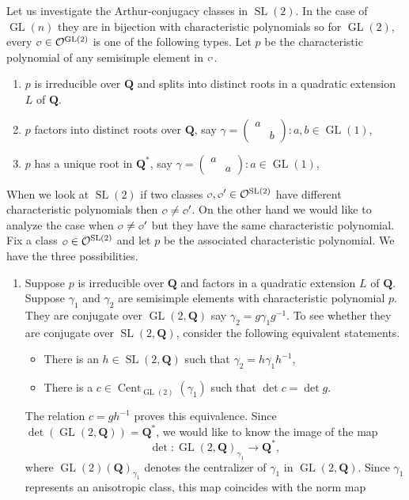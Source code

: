 \documentclass[11pt]{amsart}
\def\Q{\mathbf Q}
\def\O{\mathcal O}
\def\o{\scalebox{0.8}{$\scriptstyle\mathcal{O}$}}
\def\cb#1{{\color{blue}#1}}
\def\cent{\operatorname{Cent}}
\def\det{\operatorname{det}}
\def\gl{\operatorname{GL}}
\def\sl{\operatorname{SL}}
\theoremstyle{remark}
\begin{document}
\cb{Let us investigate the Arthur-conjugacy classes in $\sl(2)$. In the case of $\gl(n)$ they are in bijection with characteristic polynomials so for $\gl(2)$, every $\o \in \O^{\gl(2)}$ is one of the following types. Let $p$ be the characteristic polynomial of any semisimple element in $\o$. 
\begin{enumerate}
	\item $p$ is irreducible over $\Q$ and splits into distinct roots in a quadratic extension $L$ of $\Q$.
	\item $p$ factors into distinct roots over $\Q$, say $\gamma = \begin{pmatrix} a & \\ & b \end{pmatrix}: 
			a, b \in \gl(1)$,
	\item $p$ has a unique root in $\Q^*$, say $\gamma = \begin{pmatrix} a & \\ & a \end{pmatrix}: a \in \gl(1)$,
\end{enumerate}
When we look at $\sl(2)$ if two classes $\o, \o' \in \O^{\sl(2)}$ have different characteristic polynomials then $\o \neq \o'$. On the other hand we would like to analyze the case when $\o \neq \o'$ but they have the same characteristic polynomial. Fix a class $\o \in \O^{\sl(2)}$ and let $p$ be the associated characteristic polynomial. We have the three possibilities. 
\begin{enumerate}
	\item Suppose $p$ is irreducible over $\Q$ and factors in a quadratic extension $L$ of $\Q$. Suppose $\gamma_1$ and $\gamma_2$ are semisimple elements with characteristic polynomial $p$. They are conjugate over $\gl(2, \Q)$ say $\gamma_2 = g \gamma_1 g^{-1}$. To see whether they are conjugate over $\sl(2, \Q)$, consider the following equivalent statements. 
	\begin{itemize}
		\item There is an $h \in \sl(2, \Q)$ such that $\gamma_2 = h \gamma_1 h^{-1}$,
		\item There is a $c \in \cent_{\gl(2)}(\gamma_1)$ such that $\det c = \det g$. 
	\end{itemize}
		The relation $c = gh^{-1}$ proves this equivalence. Since $\det(\gl(2, \Q)) = \Q^*$, we would like to know the image of the map
    		\[ \det : \gl(2, \Q)_{\gamma_1} \to \Q^*, \]
		where $\gl(2)(\Q)_{\gamma_1}$ denotes the centralizer of $\gamma_1$ in $\gl(2, \Q)$. Since $\gamma_1$ represents an anisotropic class, this map coincides with the norm map

\end{enumerate}}
\end{document}
